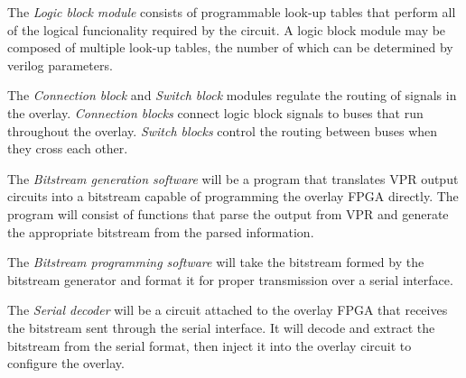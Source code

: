 The \emph{Logic block module} consists of programmable look-up tables that perform all of the logical 
funcionality required by the circuit.
A logic block module may be composed of multiple look-up tables, the number of which 
can be determined by verilog parameters.

The \emph{Connection block} and \emph{Switch block} modules regulate the routing of signals in the overlay.
\emph{Connection blocks} connect logic block signals to buses that run throughout the 
overlay.
\emph{Switch blocks} control the routing between buses when they cross each other.

The \emph{Bitstream generation software} will be a program that translates VPR output circuits into a 
bitstream capable of programming the overlay FPGA directly.
The program will consist of functions that parse the output from VPR and generate the 
appropriate bitstream from the parsed information.

The \emph{Bitstream programming software} will take the bitstream formed by the bitstream generator 
and format it for proper transmission over a serial interface.

The \emph{Serial decoder} will be a circuit attached to the overlay FPGA that receives the 
bitstream sent through the serial interface.
It will decode and extract the bitstream 
from the serial format, then inject it into the overlay circuit to configure the 
overlay.


